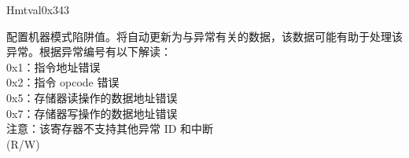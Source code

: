 \begin{register}{H}{mtval}{0x343}\label{regdesc:LPMTVAL}
%
\regnewline%
\begin{regdesc}\begin{reglist}
\label{fielddesc:LPMTVAL}\item [MTVAL] 配置机器模式陷阱值。将自动更新为与异常有关的数据，该数据可能有助于处理该异常。根据异常编号有以下解读：\\
0x1：指令地址错误\\
0x2：指令 opcode 错误\\
0x5：存储器读操作的数据地址错误\\
0x7：存储器写操作的数据地址错误\\
注意：该寄存器不支持其他异常 ID 和中断\\
(R/W)
\end{reglist}\end{regdesc}
\end{register}


